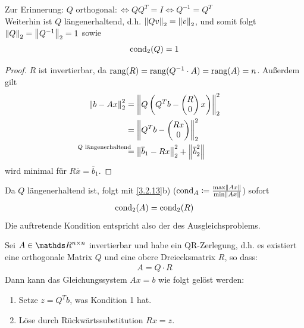 Zur Erinnerung:
$Q \text{ orthogonal} :\Leftrightarrow QQ^T = I
\Leftrightarrow Q^{-1} = Q^T$\\
Weiterhin ist $Q$ längenerhaltend,
d.h. $\nn[Qv]_2 = \nn[v]_2$, und somit folgt
$\nn[Q]_2 = \nn[Q^{-1}]_2 = 1$ sowie
\begin{gather}
  \Cond_2(Q) = 1
  \label{IV.3.11}
\end{gather}

\begin{proof} $R$ ist invertierbar, da 
  $\Rang(R) = \Rang(Q^{-1}\cdot A) = \Rang(A) = n$.
  Außerdem gilt
  \begin{align*}
    \nn[b-Ax]_2^2 & = \nn[Q\left(Q^Tb-\begin{pmatrix}R\\0\end{pmatrix}x\right)]_2^2 \\
                  &=  \nn[Q^Tb-\begin{pmatrix}Rx\\0\end{pmatrix}]_2^2  \\
                  &\overset{\mathllap{\text{$Q$ längenerhaltend}}}{=}
                    \nn[\overline{b}_1 - Rx]_2^2  + \nn[\overline{b}_2^2]
  \end{align*}
  wird minimal für $R\overline{x} = \overline{b}_1$.
\end{proof}

Da $Q$ längenerhaltend ist, folgt mit \ref{3.2.13}b)
($\Cond_A \coloneqq \frac{\max \nn[Ax]}{\min \nn[Ax]}$)
sofort
\begin{gather*}
  \Cond_2(A) = \Cond_2(R)
\end{gather*}
Die auftretende Kondition entspricht also der des Ausgleichsproblems.


\begin{Beme}
  Sei $A\in \Renn$ invertierbar und habe ein QR-Zerlegung, d.h. es existiert
  eine orthogonale Matrix $Q$ und eine obere Dreiecksmatrix $R$, so dass:
  \begin{gather*}
    A= Q\cdot R
  \end{gather*}
  Dann kann das Gleichungssystem $Ax=b$ wie folgt gelöst werden:
  \begin{enumerate}[1.]
  \item Setze $z=Q^Tb$, was Kondition 1 hat.
  \item Löse durch Rückwärtssubstitution $Rx=z$.
  \end{enumerate}
\end{Beme}


